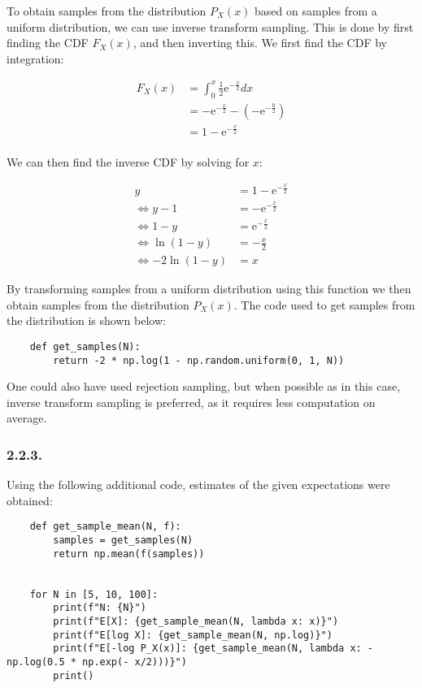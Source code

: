 \documentclass[a4paper, 12pt]{article}
\begin{document}
To obtain samples from the distribution $P_X(x)$ based on samples from a uniform distribution, we can use inverse transform sampling. This is done by first finding the CDF $F_X(x)$, and then inverting this. We first find the CDF by integration:

\begin{align}
	F_X(x) &= \int_{0}^{x} \frac{1}{2} \text{e}^{-\frac{x}{2}} dx\\
	&= -\text{e}^{-\frac{x}{2}} - \left(-\text{e}^{-\frac{0}{2}}\right) \\
	&= 1 - \text{e}^{-\frac{x}{2}}\\
\end{align}

We can then find the inverse CDF by solving for $x$:

\begin{align}
	y &= 1 - \text{e}^{-\frac{x}{2}}\\
	\iff y - 1 &= -\text{e}^{-\frac{x}{2}}\\
	\iff 1 - y &= \text{e}^{-\frac{x}{2}}\\
	\iff \ln (1 - y) &= -\frac{x}{2}\\
	\iff - 2 \ln (1 - y) &= x
\end{align}

By transforming samples from a uniform distribution using this function we then obtain samples from the distribution $P_X(x)$.
The code used to get samples from the distribution is shown below:

\begin{verbatim}
	def get_samples(N):
		return -2 * np.log(1 - np.random.uniform(0, 1, N))
\end{verbatim}

One could also have used rejection sampling, but when possible as in this case, inverse transform sampling is preferred, as it requires less computation on average.

\subsubsection{2.2.3.}

Using the following additional code, estimates of the given expectations were obtained:

\begin{verbatim}
	def get_sample_mean(N, f):
		samples = get_samples(N)
		return np.mean(f(samples))
	
	
	for N in [5, 10, 100]:
		print(f"N: {N}")
		print(f"E[X]: {get_sample_mean(N, lambda x: x)}")
		print(f"E[log X]: {get_sample_mean(N, np.log)}")
		print(f"E[-log P_X(x)]: {get_sample_mean(N, lambda x: - np.log(0.5 * np.exp(- x/2)))}")
		print()
\end{verbatim}
\end{document}
